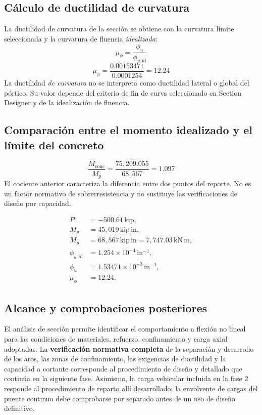 \documentclass[11pt,a4paper]{article}
\begin{document}
\subsection{Cálculo de ductilidad de curvatura}
La ductilidad de curvatura de la sección se obtiene con la curvatura
límite seleccionada y la curvatura de fluencia \emph{idealizada}:
\begin{equation*}
\mu_{\phi}=\frac{\phi_{u}}{\phi_{y,\mathrm{id}}}
\end{equation*}
\begin{equation*}
\mu_{\phi}=\frac{0.00153471}{0.0001254}
=\boxed{12.24}
\end{equation*}
La ductilidad \emph{de curvatura} no se interpreta como ductilidad
lateral o global del pórtico. Su valor depende del criterio de fin de
curva seleccionado en Section Designer y de la idealización de fluencia.

\subsection{Comparación entre el momento idealizado y el límite del concreto}
\begin{equation*}
\frac{M_{\mathrm{conc}}}{M_p}
=\frac{75{,}209.055}{68{,}567}
=\boxed{1.097}
\end{equation*}
El cociente anterior caracteriza la diferencia entre dos puntos del
reporte. No es un factor normativo de sobrerresistencia y no sustituye
las verificaciones de diseño por capacidad.

\begin{tcolorbox}[title={Resultados consolidados de la fase 3}]
\begin{align*}
P&=-500.61\,\mathrm{kip},\\
M_y&=45{,}019\,\mathrm{kip\,in},\\
M_p&=\boxed{68{,}567\,\mathrm{kip\,in}}
     =\boxed{7{,}747.03\,\mathrm{kN\,m}},\\
\phi_{y,\mathrm{id}}&=1.254\times10^{-4}\,\mathrm{in}^{-1},\\
\phi_u&=1.53471\times10^{-3}\,\mathrm{in}^{-1},\\
\mu_{\phi}&=\boxed{12.24}.
\end{align*}
\end{tcolorbox}

\subsection*{Alcance y comprobaciones posteriores}
El análisis de sección permite identificar el comportamiento a flexión
no lineal para las condiciones de materiales, refuerzo, confinamiento y
carga axial adoptadas. La \textbf{verificación normativa completa} de
la separación y desarrollo de los aros, las zonas de confinamiento,
las exigencias de ductilidad y la capacidad a cortante corresponde al
procedimiento de diseño y detallado que continúa en la siguiente fase.
Asimismo, la carga vehicular incluida en la fase 2 responde al
procedimiento de reparto allí desarrollado; la envolvente de cargas
del puente continuo debe comprobarse por separado antes de un uso de
diseño definitivo.
\end{document}
